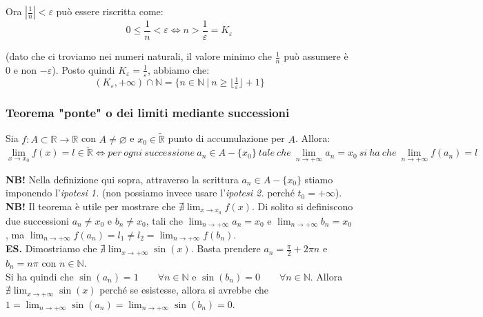 \documentclass{article}
\begin{document}
\noindent Ora $|\frac{1}{n}| < \varepsilon$ può essere riscritta come:
\begin{equation*}
    0 \leq \frac{1}{n} < \varepsilon \iff n > \frac{1}{\varepsilon} = K_\varepsilon
\end{equation*}

\noindent (dato che ci troviamo nei numeri naturali, il valore minimo che $\frac{1}{n}$ può assumere è $0$ e non $-\varepsilon$). Posto quindi $K_\varepsilon = \frac{1}{\varepsilon}$, abbiamo che:
\begin{equation*}
    (K_\varepsilon, +\infty) \cap \mathbb{N} = \{n \in \mathbb{N} \ | \ n \geq \lfloor \tfrac{1}{\varepsilon} \rfloor + 1\}
\end{equation*}

\subsubsection{Teorema "ponte" o dei limiti mediante successioni}
Sia $f: A \subset \mathbb{R} \xrightarrow{} \mathbb{R}$ con $A \neq \varnothing$ e $x_0 \in \widetilde{\mathbb{R}}$ punto di accumulazione per $A$. Allora:
\begin{equation*}
    \lim_{x \to x_0} f(x) = l \in \widetilde{\mathbb{R}} \iff per \ ogni \ successione \ a_n \in A - \{x_0\} \ tale \ che \ \lim_{n \to +\infty} a_n = x_0 \ si \ ha \ che \ \lim_{n \to +\infty} f(a_n) = l
\end{equation*}

\noindent\textbf{NB!} Nella definizione qui sopra, attraverso la scrittura $a_n \in A - \{x_0\}$ stiamo imponendo l'\textit{ipotesi 1.} (non possiamo invece usare l'\textit{ipotesi 2.} perché $t_0 = +\infty$).\\

\noindent\textbf{NB!} Il teorema è utile per mostrare che $\nexists \lim_{x \to x_0} f(x)$. Di solito si definiscono due successioni $a_n \neq x_0$ e $b_n \neq x_0$, tali che $\lim_{n \to +\infty} a_n = x_0$ e $\lim_{n \to +\infty} b_n = x_0$, ma $\lim_{n \to +\infty} f(a_n) = l_1 \neq l_2 = \lim_{n \to +\infty} f(b_n)$.\\

\noindent\textbf{ES.} Dimostriamo che $\nexists \lim_{x \to +\infty} \sin(x)$. Basta prendere $a_n = \frac{\pi}{2} + 2\pi n$ e $b_n = n\pi$ con $n \in \mathbb{N}$.\\
Si ha quindi che $\sin(a_n) = 1 \qquad \forall n \in \mathbb{N}$ e $\sin(b_n) = 0 \qquad \forall n \in \mathbb{N}$. Allora $\nexists \lim_{x \to +\infty} \sin(x)$ perché se esistesse, allora si avrebbe che $1 = \lim_{n \to +\infty} \sin(a_n) = \lim_{n \to +\infty} \sin(b_n) = 0$.\\
\end{document}
